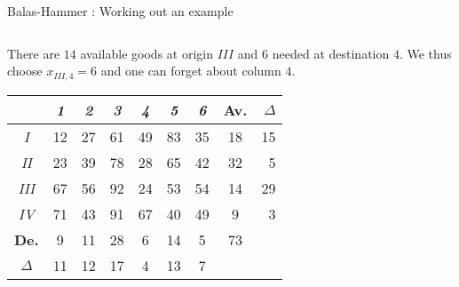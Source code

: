 \documentclass[32pt,aspectratio=169]{beamer}
\begin{document}
\begin{frame}{Balas-Hammer : Working out an example}
  \begin{columns}
    \begin{column}{.6\textwidth}
      There are $14$ available goods at origin $III$ and $6$ needed at
      destination $4$. We thus choose $x_{III,4} = 6$ and one can
      forget about column $4$.

      \begin{overlayarea}{\textwidth}{.5\textheight}      
        \vspace{.45cm}
        \small{
          \begin{tabular}{c|c|c|c|c|c|c|c|r}
            & \textit{1} & \textit{2} & \textit{3} & \textit{4} & \textit{5} & \textit{6} & \cellcolor{blue!50}\textbf{Av.} & \color{blue}$\Delta$\\
            \hline
            \textit{I} & \cellcolor{blue!25}12 & \cellcolor{blue!25}27 & \cellcolor{blue!25}61 & \cellcolor{orange}49 & \cellcolor{blue!25}83 & \cellcolor{blue!25}35 & \cellcolor{blue!50}18 & \color{blue}15 \\
            \hline 
            \textit{II} & \cellcolor{blue!25}23 & \cellcolor{blue!25}39 & \cellcolor{blue!25}78 & \cellcolor{orange}28 & \cellcolor{blue!25}65 & \cellcolor{blue!25}42 & \cellcolor{blue!50}32 & \color{blue}5 \\
            \hline
            \cellcolor{orange}\textit{III} & \cellcolor{orange}67 & \cellcolor{orange}56 & \cellcolor{orange}92 & \cellcolor{orange}24 & \cellcolor{orange}53 & \cellcolor{orange}54 & \cellcolor{blue!50}14 & \cellcolor{orange}\color{blue}29 \\
            \hline
            \textit{IV} & \cellcolor{blue!25}71 & \cellcolor{blue!25}43 & \cellcolor{blue!25}91 & \cellcolor{orange}67 & \cellcolor{blue!25}40 & \cellcolor{blue!25}49 & \cellcolor{blue!50}9 & \color{blue}3 \\
            \hline 
            \cellcolor{blue!50}\textbf{De.} & \cellcolor{blue!50}9 & \cellcolor{blue!50}11 & \cellcolor{blue!50}28 & \cellcolor{blue!50}6 & \cellcolor{blue!50}14 & \cellcolor{blue!50}5 & \cellcolor{blue!60}73 & \\            
            \cline{1-8}
            \color{blue}$\Delta$ & \color{blue}11 & \color{blue}12 & \color{blue}17 & \color{blue}4 & \color{blue}13 & \color{blue}7   
          \end{tabular}
        }
      \end{overlayarea}
    \end{column}

\end{columns}
\end{frame}
\end{document}
